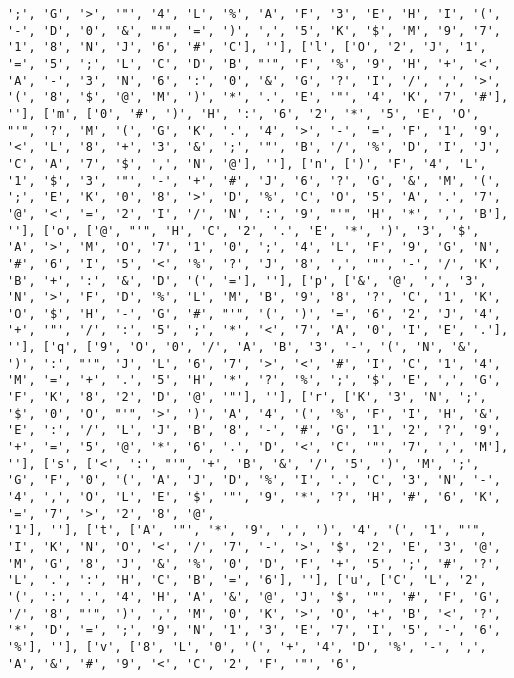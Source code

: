 \documentclass{article}
\begin{document}
\begin{verbatim}
';', 'G', '>', '"', '4', 'L', '%', 'A', 'F', '3', 'E', 'H', 'I', '(', '-', 'D', '0', '&', "'", '=', ')', ',', '5', 'K', '$', 'M', '9', '7', '1', '8', 'N', 'J', '6', '#', 'C'], ''], ['l', ['O', '2', 'J', '1', '=', '5', ';', 'L', 'C', 'D', 'B', "'", 'F', '%', '9', 'H', '+', '<', 'A', '-', '3', 'N', '6', ':', '0', '&', 'G', '?', 'I', '/', ',', '>', '(', '8', '$', '@', 'M', ')', '*', '.', 'E', '"', '4', 'K', '7', '#'], ''], ['m', ['0', '#', ')', 'H', ':', '6', '2', '*', '5', 'E', 'O', "'", '?', 'M', '(', 'G', 'K', '.', '4', '>', '-', '=', 'F', '1', '9', '<', 'L', '8', '+', '3', '&', ';', '"', 'B', '/', '%', 'D', 'I', 'J', 'C', 'A', '7', '$', ',', 'N', '@'], ''], ['n', [')', 'F', '4', 'L', '1', '$', '3', '"', '-', '+', '#', 'J', '6', '?', 'G', '&', 'M', '(', ';', 'E', 'K', '0', '8', '>', 'D', '%', 'C', 'O', '5', 'A', '.', '7', '@', '<', '=', '2', 'I', '/', 'N', ':', '9', "'", 'H', '*', ',', 'B'], ''], ['o', ['@', "'", 'H', 'C', '2', '.', 'E', '*', ')', '3', '$', 'A', '>', 'M', 'O', '7', '1', '0', ';', '4', 'L', 'F', '9', 'G', 'N', '#', '6', 'I', '5', '<', '%', '?', 'J', '8', ',', '"', '-', '/', 'K', 'B', '+', ':', '&', 'D', '(', '='], ''], ['p', ['&', '@', ',', '3', 'N', '>', 'F', 'D', '%', 'L', 'M', 'B', '9', '8', '?', 'C', '1', 'K', 'O', '$', 'H', '-', 'G', '#', "'", '(', ')', '=', '6', '2', 'J', '4', '+', '"', '/', ':', '5', ';', '*', '<', '7', 'A', '0', 'I', 'E', '.'], ''], ['q', ['9', 'O', '0', '/', 'A', 'B', '3', '-', '(', 'N', '&', ')', ':', "'", 'J', 'L', '6', '7', '>', '<', '#', 'I', 'C', '1', '4', 'M', '=', '+', '.', '5', 'H', '*', '?', '%', ';', '$', 'E', ',', 'G', 'F', 'K', '8', '2', 'D', '@', '"'], ''], ['r', ['K', '3', 'N', ';', '$', '0', 'O', "'", '>', ')', 'A', '4', '(', '%', 'F', 'I', 'H', '&', 'E', ':', '/', 'L', 'J', 'B', '8', '-', '#', 'G', '1', '2', '?', '9', '+', '=', '5', '@', '*', '6', '.', 'D', '<', 'C', '"', '7', ',', 'M'], ''], ['s', ['<', ':', "'", '+', 'B', '&', '/', '5', ')', 'M', ';', 'G', 'F', '0', '(', 'A', 'J', 'D', '%', 'I', '.', 'C', '3', 'N', '-', '4', ',', 'O', 'L', 'E', '$', '"', '9', '*', '?', 'H', '#', '6', 'K', '=', '7', '>', '2', '8', '@', 
'1'], ''], ['t', ['A', '"', '*', '9', ',', ')', '4', '(', '1', "'", 'I', 'K', 'N', 'O', '<', '/', '7', '-', '>', '$', '2', 'E', '3', '@', 'M', 'G', '8', 'J', '&', '%', '0', 'D', 'F', '+', '5', ';', '#', '?', 'L', '.', ':', 'H', 'C', 'B', '=', '6'], ''], ['u', ['C', 'L', '2', '(', ':', '.', '4', 'H', 'A', '&', '@', 'J', '$', '"', '#', 'F', 'G', '/', '8', "'", ')', ',', 'M', '0', 'K', '>', 'O', '+', 'B', '<', '?', '*', 'D', '=', ';', '9', 'N', '1', '3', 'E', '7', 'I', '5', '-', '6', '%'], ''], ['v', ['8', 'L', '0', '(', '+', '4', 'D', '%', '-', ',', 'A', '&', '#', '9', '<', 'C', '2', 'F', '"', '6', 

\end{verbatim}
\end{document}

